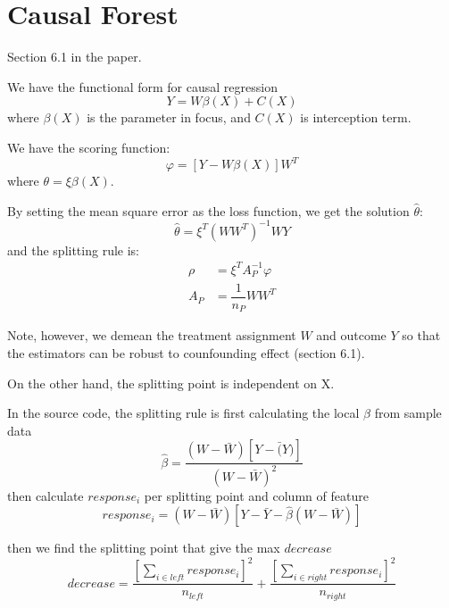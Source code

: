 \documentclass[12pt,letterpaper]{article}
\begin{document}
\section{Causal Forest }
Section 6.1 in the paper.

We have the functional form for causal regression
\begin{equation}\label{key}
	Y = W\beta(X) + C(X)
\end{equation}
where $ \beta(X) $ is the parameter in focus, and $ C(X) $ is interception term. 

We have the scoring function:
\begin{equation}\label{key}
	\varphi = [Y-W\beta(X)]W^T
\end{equation}
where $ \theta = \xi \beta(X) $.
 
By setting the  mean square error as the loss function, we get the solution $\hat{\theta} $:
\begin{equation}\label{key}
	\hat{\theta} = \xi^T(WW^{T})^{-1}WY
\end{equation}
and the splitting rule is:
\begin{align}\label{key}
	\rho & = \xi^T A_{P}^{-1}\varphi \\ 
	A_{P} & = \dfrac{1}{n_P} WW^T 
\end{align}

Note, however, we demean the treatment assignment $ W $ and outcome $ Y $ so that the estimators can be robust to counfounding effect (section 6.1).

On the other hand, the splitting point is independent on X.


In the source code, the splitting rule is first calculating the local $ \beta $ from sample data
\begin{equation}\label{key}
	\hat{\beta} = \dfrac{(W-\bar{W})[Y-\bar(Y)]}{(W-\bar{W})^2}
\end{equation}
then calculate $ response_{i} $ per splitting point and column of feature
\begin{equation}\label{key}
		response_{i} = (W-\bar{W})[Y-\bar{Y} - \hat{\beta}(W-\bar{W})] 
\end{equation}

then we find the splitting point that give the max $ decrease $
\begin{equation}\label{key}
	decrease = \dfrac{[\sum\limits_{i \in left} response_{i}]^2}{n_{left}} +  \dfrac{[\sum\limits_{i \in right} response_{i}]^2}{n_{right}}
\end{equation}
\end{document}
